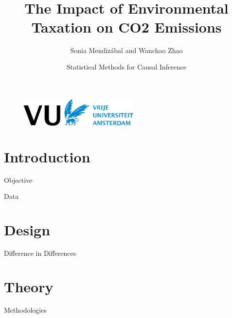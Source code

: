 \documentclass{beamer}
\title{The Impact of Environmental Taxation on CO2 Emissions}
\author{Sonia Mendizábal and Wanchao Zhao}
\date{Statistical Methods for Causal Inference}
\begin{document}
\expandafter\def\expandafter\insertshorttitle\expandafter{%
  \insertshorttitle\hfill%
  \insertframenumber\,/\,\inserttotalframenumber}

\begin{frame}[noframenumbering]
\maketitle
\vspace{-10pt}
\begin{figure}
    \centering
    \includegraphics[width=6cm]{figures/vu_logo.png}
\end{figure}
\end{frame}

\section{Introduction}

\begin{frame}{Objective}

\end{frame}

\begin{frame}{Data}

\end{frame}


\section{Design}

\begin{frame}{Difference in Differences}

\end{frame}


\section{Theory}

\begin{frame}{Methodologies}

\end{frame}
\end{document}
